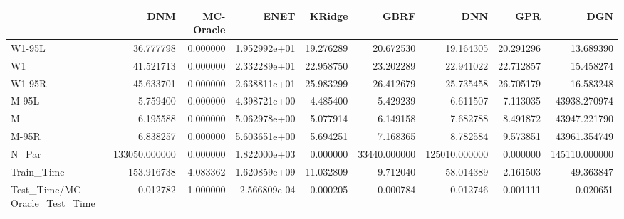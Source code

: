 \begin{tabular}{lrrrrrrrr}
\toprule
{} &            DNM &  MC-Oracle &          ENET &     KRidge &          GBRF &            DNN &        GPR &            DGN \\
\midrule
W1-95L                        &      36.777798 &   0.000000 &  1.952992e+01 &  19.276289 &     20.672530 &      19.164305 &  20.291296 &      13.689390 \\
W1                            &      41.521713 &   0.000000 &  2.332289e+01 &  22.958750 &     23.202289 &      22.941022 &  22.712857 &      15.458274 \\
W1-95R                        &      45.633701 &   0.000000 &  2.638811e+01 &  25.983299 &     26.412679 &      25.735458 &  26.705179 &      16.583248 \\
M-95L                         &       5.759400 &   0.000000 &  4.398721e+00 &   4.485400 &      5.429239 &       6.611507 &   7.113035 &   43938.270974 \\
M                             &       6.195588 &   0.000000 &  5.062978e+00 &   5.077914 &      6.149158 &       7.682788 &   8.491872 &   43947.221790 \\
M-95R                         &       6.838257 &   0.000000 &  5.603651e+00 &   5.694251 &      7.168365 &       8.782584 &   9.573851 &   43961.354749 \\
N\_Par                         &  133050.000000 &   0.000000 &  1.822000e+03 &   0.000000 &  33440.000000 &  125010.000000 &   0.000000 &  145110.000000 \\
Train\_Time                    &     153.916738 &   4.083362 &  1.620859e+09 &  11.032809 &      9.712040 &      58.014389 &   2.161503 &      49.363847 \\
Test\_Time/MC-Oracle\_Test\_Time &       0.012782 &   1.000000 &  2.566809e-04 &   0.000205 &      0.000784 &       0.012746 &   0.001111 &       0.020651 \\
\bottomrule
\end{tabular}
